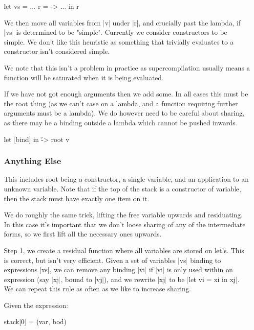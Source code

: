 \documentclass{sigplanconf}
\begin{document}
\begin{code}
let vs  = ...
    r  = \x -> ...
in r
\end{code}

We then move all variables from |v| under |r|, and crucially past the lambda, if |vs| is determined to be "simple". Currently we consider constructors to be simple. We don't like this heuristic as something that trivially evaluates to a constructor isn't considered simple.

We note that this isn't a problem in practice as supercompilation usually means a function will be saturated when it is being evaluated.


If we have not got enough arguments then we add some. In all cases this must be the root thing (as we can't case on a lambda, and a function requiring further arguments must be a lambda). We do however need to be careful about sharing, as there may be a binding outside a lambda which cannot be pushed inwards.

\begin{code}
let [bind]
in \v -> root v
\end{code}

\subsubsection{Anything Else}

This includes root being a constructor, a single variable, and an application to an unknown variable. Note that if the top of the stack is a constructor of variable, then the stack must have exactly one item on it.

We do roughly the same trick, lifting the free variable upwards and residuating. In this case it's important that we don't loose sharing of any of the intermediate forms, so we first lift all the necessary ones upwards.

Step 1, we create a residual function where all variables are stored on let's. This is correct, but isn't very efficient. Given a set of variables |vs| binding to expressions |xs|, we can remove any binding |vi| if |vi| is only used within on expression (say |xj|, bound to |vj|), and we rewrite |xj| to be |let vi = xi in xj|. We can repeat this rule as often as we like to increase sharing.

Given the expression:

\begin{code}
stack[0] = (var, bod)
\end{code}
\end{document}
